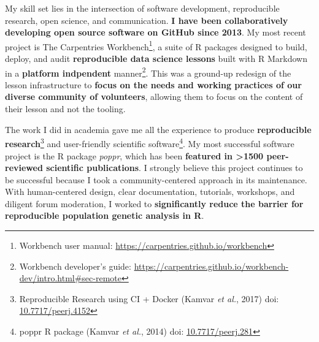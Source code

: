 \vspace{2ex}


My skill set lies in the intersection of software development,
reproducible research, open science, and communication. 
\textbf{I have been collaboratively developing open source software on GitHub
since 2013}.
My most recent project is The Carpentries Workbench\footnote{Workbench user manual: \url{https://carpentries.github.io/workbench}}, 
a suite of R packages designed to build, deploy, and audit \textbf{reproducible
data science lessons} built with R Markdown in a \textbf{platform indpendent} manner\footnote{Workbench developer's guide: \url{https://carpentries.github.io/workbench-dev/intro.html\#sec-remote}}.
This was a ground-up redesign of the lesson infrastructure to \textbf{focus on
the needs and working practices of our diverse community of volunteers},
allowing them to focus on the content of their lesson and not the tooling.






\vspace{2ex}

The work I did in academia gave me all the experience to produce 
\textbf{reproducible research}\footnote{Reproducible Research using CI + Docker (Kamvar \textit{et al.}, 2017) doi: \href{https://doi.org/10.7717/peerj.4152}{10.7717/peerj.4152}}
and user-friendly scientific software\footnote{poppr R package (Kamvar \textit{et al.}, 2014) doi: \href{https://doi.org/10.7717/peerj.281}{10.7717/peerj.281}}.
My most successful software project is the R package
\textit{poppr}, which has been \textbf{featured in \textgreater1500
peer-reviewed scientific publications}. I strongly believe this project
continues to be successful because I took a community-centered approach in its
maintenance. With human-centered design, clear documentation, tutorials,
workshops, and diligent forum moderation, I worked to \textbf{significantly
reduce the barrier for reproducible population genetic analysis in R}.

